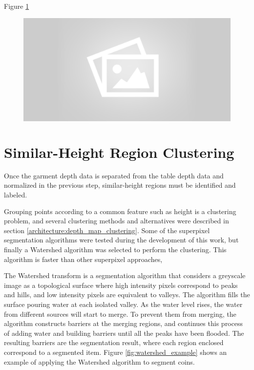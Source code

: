 Figure \ref{fig:depth_map_preprocessing} \comment{[...]}

\begin{figure}[thpb]
    \centering
    \includegraphics[width=0.7
    \textwidth]{figures/placeholder2.png}
    \caption{}
    \label{fig:depth_map_preprocessing}
\end{figure}


\section{Similar-Height Region Clustering}
\label{garment_clustering_watershed}

Once the garment depth data is separated from the table depth data and normalized in the previous step, similar-height regions must be identified and labeled.

Grouping points according to a common feature such as height is a clustering problem, and several clustering methods and alternatives were described in section \ref{architecture:depth_map_clustering}. Some of the superpixel segmentation algorithms were tested during the development of this work, but finally a Watershed  algorithm was selected to perform the clustering. This algorithm is faster than other superpixel approaches, \comment{[...]}

The Watershed transform is a segmentation algorithm that considers a greyscale image as a topological surface where high intensity pixels correspond to peaks and hills, and low intensity pixels are equivalent to valleys. The algorithm fills the surface pouring water at each isolated valley. As the water level rises, the water from different sources will start to merge. To prevent them from merging, the algorithm constructs barriers at the merging regions, and continues this process of adding water and building barriers until all the peaks have been flooded. The resulting barriers are the segmentation result, where each region enclosed correspond to a segmented item. Figure \ref{fig:watershed_example} shows an example of applying the Watershed algorithm to segment coins.

